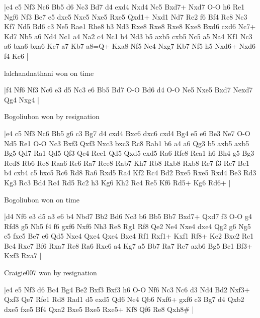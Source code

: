 \makegametitle
|e4 e5 Nf3 Nc6 Bb5 d6 Nc3 Bd7 d4 exd4 Nxd4 Ne5 Bxd7+ Nxd7 O-O h6 Re1 Ngf6 Nf3 Be7 e5 dxe5 Nxe5 Nxe5 Rxe5 Qxd1+ Nxd1 Nd7 Re2 f6 Bf4 Rc8 Nc3 Kf7 Nd5 Bd6 c3 Ne5 Rae1 Rhe8 b3 Nd3 Rxe8 Rxe8 Rxe8 Kxe8 Bxd6 cxd6 Nc7+ Kd7 Nb5 a6 Nd4 Nc1 a4 Na2 c4 Nc1 b4 Nd3 b5 axb5 cxb5 Nc5 a5 Na4 Kf1 Nc3 a6 bxa6 bxa6 Kc7 a7 Kb7 a8=Q+ Kxa8 Nf5 Ne4 Nxg7 Kb7 Nf5 h5 Nxd6+ Nxd6 f4 Kc6  |

\showboard

lalchandnathani won on time

\makegametitle
|f4 Nf6 Nf3 Nc6 e3 d5 Nc3 e6 Bb5 Bd7 O-O Bd6 d4 O-O Ne5 Nxe5 Bxd7 Nexd7 Qg4 Nxg4  |

\showboard

Bogoliubon won by resignation

\makegametitle
|e4 c5 Nf3 Nc6 Bb5 g6 c3 Bg7 d4 cxd4 Bxc6 dxc6 cxd4 Bg4 e5 e6 Be3 Ne7 O-O Nd5 Re1 O-O Nc3 Bxf3 Qxf3 Nxc3 bxc3 Rc8 Rab1 b6 a4 a6 Qg3 b5 axb5 axb5 Bg5 Qd7 Ra1 Qd5 Qf3 Qc4 Rec1 Qd5 Qxd5 exd5 Ra6 Rfe8 Rca1 h6 Bh4 g5 Bg3 Red8 Rb6 Re8 Raa6 Re6 Ra7 Rce8 Rab7 Kh7 Rb8 Rxb8 Rxb8 Re7 f3 Rc7 Be1 b4 cxb4 c5 bxc5 Rc6 Rd8 Ra6 Rxd5 Ra4 Kf2 Rc4 Bd2 Bxe5 Rxe5 Rxd4 Be3 Rd3 Kg3 Rc3 Bd4 Rc4 Rd5 Rc2 h3 Kg6 Kh2 Rc4 Re5 Kf6 Rd5+ Kg6 Rd6+  |

\showboard

Bogoliubon won on time

\makegametitle
|d4 Nf6 e3 d5 a3 e6 b4 Nbd7 Bb2 Bd6 Nc3 b6 Bb5 Bb7 Bxd7+ Qxd7 f3 O-O g4 Rfd8 g5 Nh5 f4 f6 gxf6 Nxf6 Nh3 Re8 Rg1 Rf8 Qe2 Ne4 Nxe4 dxe4 Qg2 g6 Ng5 e5 fxe5 Be7 e6 Qd5 Nxe4 Qxe4 Qxe4 Bxe4 Rf1 Rxf1+ Kxf1 Rf8+ Ke2 Bxc2 Rc1 Be4 Rxc7 Bf6 Rxa7 Re8 Ra6 Rxe6 a4 Kg7 a5 Bb7 Ra7 Re7 axb6 Bg5 Bc1 Bf3+ Kxf3 Rxa7  |

\showboard

Craigie007 won by resignation

\makegametitle
|e4 e5 Nf3 d6 Bc4 Bg4 Be2 Bxf3 Bxf3 h6 O-O Nf6 Nc3 Nc6 d3 Nd4 Bd2 Nxf3+ Qxf3 Qe7 Rfe1 Rd8 Rad1 d5 exd5 Qd6 Ne4 Qb6 Nxf6+ gxf6 c3 Bg7 d4 Qxb2 dxe5 fxe5 Bf4 Qxa2 Bxe5 Bxe5 Rxe5+ Kf8 Qf6 Re8 Qxh8\#  |

\showboard

